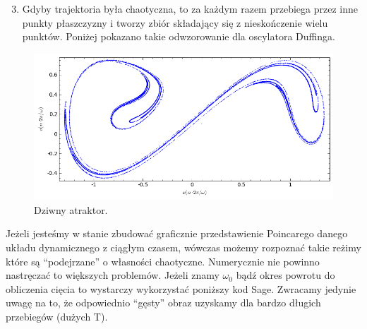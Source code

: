\documentclass[a4paper,12pt,polish]{sphinxmanual}
\begin{document}
\begin{enumerate}
\setcounter{enumi}{2}
\item {} 
Gdyby trajektoria była chaotyczna, to za każdym razem przebiega przez inne punkty płaszczyzny i tworzy zbiór składający się z nieskończenie wielu punktów. Poniżej pokazano takie odwzorowanie dla oscylatora Duffinga.

\end{enumerate}
\begin{figure}[htbp]
\centering
\capstart

\includegraphics{chaotic_duffing.png}
\caption{Dziwny atraktor.}\end{figure}

Jeżeli jesteśmy w stanie zbudować graficznie przedstawienie Poincarego danego układu dynamicznego z ciągłym czasem, wówczas możemy rozpoznać takie reżimy które są ``podejrzane'' o własności chaotyczne.  Numerycznie nie powinno nastręczać to większych problemów. Jeżeli znamy $\omega_0$ bądź okres powrotu do obliczenia cięcia to wystarczy wykorzystać poniższy kod Sage. Zwracamy jedynie uwagę na to, że odpowiednio ``gęsty'' obraz uzyskamy dla bardzo długich przebiegów (dużych T).
\end{document}
